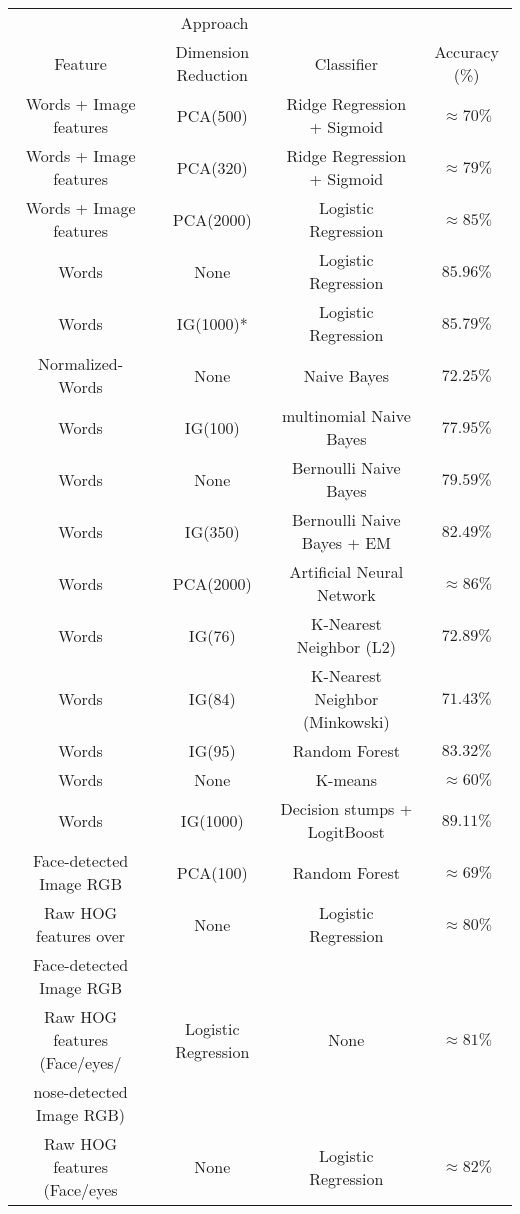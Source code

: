 \begin{table}[h!]
\centering
\begin{tabular*}{\textwidth}{c @{\extracolsep{\fill}}ccc}
\hline
\multicolumn{3}{c}{Approach} \\
\cline{1-3}
Feature & Dimension Reduction & Classifier & Accuracy (\%) \\
\hline
\hline 
Words + Image features & PCA(500) & Ridge Regression + Sigmoid & $\approx 70\%$\\ \hline
Words + Image features & PCA(320) & Ridge Regression + Sigmoid & $\approx 79\%$ \\ \hline
Words + Image features & PCA(2000) & Logistic Regression & $\approx 85\%$ \\ \hline
Words & None & Logistic Regression & $ 85.96\%$ \\ \hline
Words & IG(1000)* & Logistic Regression & $ 85.79\%$ \\ \hline
Normalized-Words & None & Naive Bayes & $72.25\%$ \\ \hline
Words & IG(100) & multinomial Naive Bayes & $ 77.95\%$ \\ \hline
Words & None & Bernoulli Naive Bayes & $ 79.59\%$ \\ \hline
Words & IG(350) & Bernoulli Naive Bayes + EM & $ 82.49\%$ \\ \hline
Words & PCA(2000) & Artificial Neural Network & $ \approx 86\%$ \\ \hline
Words & IG(76) & K-Nearest Neighbor (L2) & $ 72.89\%$ \\ \hline
Words & IG(84) & K-Nearest Neighbor (Minkowski)  & $ 71.43\%$ \\ \hline
Words & IG(95) & Random Forest & $83.32\%$ \\ \hline
Words & None & K-means & $ \approx 60\%$\\ \hline
Words & IG(1000) & Decision stumps + LogitBoost& $89.11\%$\\ \hline
Face-detected Image RGB & PCA(100) & Random Forest & $\approx 69\%$ \\ \hline
Raw HOG features over & None & Logistic Regression &  $\approx 80\%$ \\
Face-detected Image RGB &  &  &  \\  \hline
Raw HOG features (Face/eyes/ & Logistic Regression & None & $\approx 81\%$ \\ 
nose-detected Image RGB) &  &  &  \\ \hline
Raw HOG features (Face/eyes & None & Logistic Regression & $\approx 82\%$ \\ 

\end{tabular*}
\end{table}
